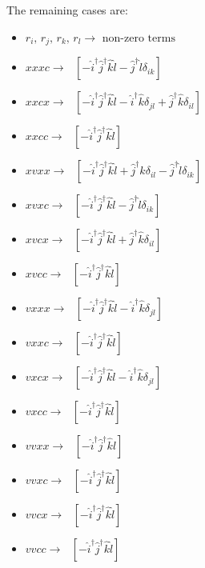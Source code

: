 \documentclass[12pt]{article}
\begin{document}
The remaining cases are:
\begin{itemize} 
\item $r_{i} \text{, \ }r_{j}\text{, \ } r_{k} \text{, \ } r_{l}   \rightarrow \text{ \ \ \ \  non-zero terms }$

\item $xxxc \rightarrow \text{ \ \ \ \ } [- \hat{i}^{\dagger} \hat{j}^{\dagger} \hat{k}\hat{l} - \hat{j}^{\dagger} \hat{l} \delta_{ik}]$

\item $xxcx 
\rightarrow \text{ \ \ \ \ } [- \hat{i}^{\dagger} \hat{j}^{\dagger} \hat{k}\hat{l}
 - \hat{i}^{\dagger} \hat{k} \delta_{jl} + \hat{j}^{\dagger} \hat{k} \delta_{il}]
$

\item $xxcc 
\rightarrow \text{ \ \ \ \ } [- \hat{i}^{\dagger} \hat{j}^{\dagger} \hat{k}\hat{l}] $

\item $xvxx 
\rightarrow \text{ \ \ \ \ } [- \hat{i}^{\dagger} \hat{j}^{\dagger} \hat{k}\hat{l}
+ \hat{j}^{\dagger} \hat{k} \delta_{il} 
- \hat{j}^{\dagger} \hat{l} \delta_{ik}] $

\item $xvxc 
\rightarrow \text{ \ \ \ \ } [- \hat{i}^{\dagger} \hat{j}^{\dagger} \hat{k}\hat{l}
- \hat{j}^{\dagger} \hat{l} \delta_{ik}] $

\item $xvcx 
\rightarrow \text{ \ \ \ \ } [- \hat{i}^{\dagger} \hat{j}^{\dagger} \hat{k}\hat{l}
+ \hat{j}^{\dagger} \hat{k} \delta_{il} ]$

\item $xvcc 
\rightarrow \text{ \ \ \ \ } [- \hat{i}^{\dagger} \hat{j}^{\dagger} \hat{k}\hat{l}]$

\item $vxxx 
\rightarrow \text{ \ \ \ \ } [- \hat{i}^{\dagger} \hat{j}^{\dagger} \hat{k}\hat{l}
- \hat{i}^{\dagger} \hat{k} \delta_{jl}]$

\item $vxxc 
\rightarrow \text{ \ \ \ \ } [- \hat{i}^{\dagger} \hat{j}^{\dagger} \hat{k}\hat{l}]$

\item $vxcx 
\rightarrow \text{ \ \ \ \ } [- \hat{i}^{\dagger} \hat{j}^{\dagger} \hat{k}\hat{l}
- \hat{i}^{\dagger} \hat{k} \delta_{jl}]$

\item $vxcc 
\rightarrow \text{ \ \ \ \ } [- \hat{i}^{\dagger} \hat{j}^{\dagger} \hat{k}\hat{l}]$

\item $vvxx 
\rightarrow \text{ \ \ \ \ } [- \hat{i}^{\dagger} \hat{j}^{\dagger} \hat{k}\hat{l}]$

\item $vvxc
\rightarrow \text{ \ \ \ \ } [- \hat{i}^{\dagger} \hat{j}^{\dagger} \hat{k}\hat{l}]$

\item $vvcx
\rightarrow \text{ \ \ \ \ } [- \hat{i}^{\dagger} \hat{j}^{\dagger} \hat{k}\hat{l}]$

\item $vvcc
\rightarrow \text{ \ \ \ \ } [- \hat{i}^{\dagger} \hat{j}^{\dagger} \hat{k}\hat{l}]$
\end{itemize}
\end{document}
